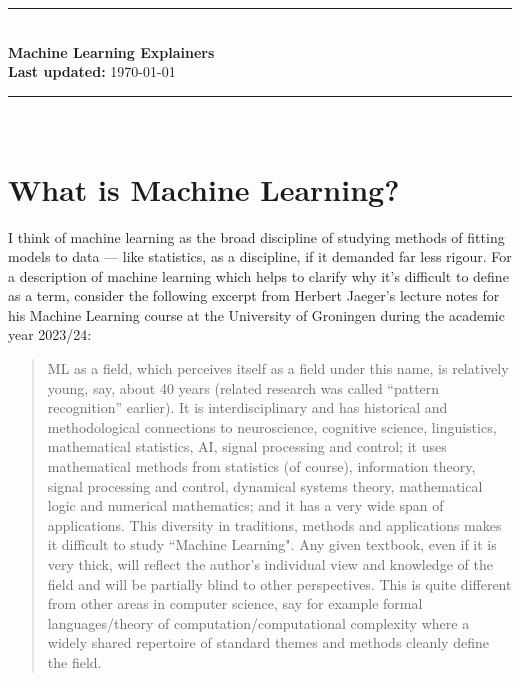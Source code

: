 \documentclass[11pt]{article}
\begin{document}
\begin{center}
\hspace*{\fill}\rule{0.95\linewidth}{0.1pt}\hspace*{\fill}\\[0.6cm]
{\huge\bfseries Machine Learning Explainers}\\[0.1cm]
\textbf{Last updated:} \today\\
\hspace*{\fill}\rule{0.95\linewidth}{0.1pt}\hspace*{\fill}\\
\end{center}

\begin{abstract}
    \noindent Summaries of some machine/deep learning-related topics. My main motive in writing these summaries is as a reminder for my future self.
\end{abstract}

\setcounter{tocdepth}{2}{\footnotesize\tableofcontents}



\thispagestyle{empty}
\setcounter{page}{0}
\newpage

\section{What is Machine Learning?}
I think of machine learning as the broad discipline of studying methods of fitting models to data — like statistics, as a discipline, if it demanded far less rigour. For a description of machine learning which helps to clarify why it's difficult to define as a term, consider the following excerpt from Herbert Jaeger's lecture notes for his Machine Learning course at the University of Groningen during the academic year 2023/24:
\begin{quotation}
    ML as a ﬁeld, which perceives itself as a ﬁeld under this name, is relatively young, say, about 40 years (related research was called “pattern recognition” earlier). It is interdisciplinary and has historical and methodological connections to neuroscience, cognitive science, linguistics, mathematical statistics, AI, signal processing and control; it uses mathematical methods from statistics (of course), information theory, signal processing and control, dynamical systems theory, mathematical logic and numerical mathematics; and it has a very wide span of applications. This diversity in traditions, methods and applications makes it diﬃcult to study ``Machine Learning". Any given textbook, even if it is very thick, will reﬂect the author's individual view and knowledge of the ﬁeld and will be partially blind to other perspectives. This is quite diﬀerent from other areas in computer science, say for example formal languages/theory of computation/computational complexity where a widely shared repertoire of standard themes and methods cleanly deﬁne the ﬁeld.
\end{quotation}
\end{document}
